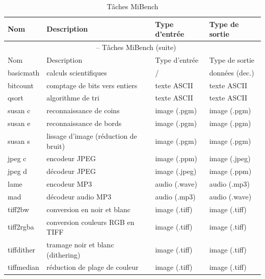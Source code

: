\documentclass[french, a4paper, 11pt, twoside, pdftex]{StyleThese}
\begin{document}
\setlength{\tabcolsep}{4pt}    
\begin{longtable}{@{}llll@{}}
	\caption{Tâches MiBench}\label{tab:mibench_tasks} \\
		\toprule
		Nom          & Description                                  & Type d'entrée      & Type de sortie         \\ \midrule
	\endfirsthead
		\multicolumn{4}{c}{\tablename\ \thetable\ -- Tâches MiBench (suite)}\\[1ex]
		\toprule
		Nom          & Description                                  & Type d'entrée      & Type de sortie         \\ \midrule
	\endhead
		\bottomrule 
	\endfoot
		basicmath	 & calculs scientifiques				& /					 & données (dec.)	\\
		bitcount     & comptage de bits	vers entiers        & texte ASCII        & texte ASCII      \\
		qsort        & algorithme de tri                    & texte ASCII        & texte ASCII      \\
		susan c      & reconnaissance de coins              & image (.pgm)       & image (.pgm)     \\
		susan e      & reconnaissance de bords              & image (.pgm)       & image (.pgm)     \\
		susan s      & lissage d'image (réduction de bruit) & image (.pgm)       & image (.pgm)     \\
		jpeg c       & encodeur JPEG                        & image (.ppm)       & image (.jpeg)    \\
		jpeg d       & décodeur JPEG                        & image (.jpeg)      & image (.ppm)     \\
		lame         & encodeur MP3                         & audio (.wave)      & audio (.mp3)     \\
		mad          & décodeur audio MP3                   & audio (.mp3)       & audio (.wave)    \\
		tiff2bw      & conversion en noir et blanc          & image (.tiff)      & image (.tiff)    \\
		tiff2rgba    & conversion couleurs RGB en TIFF		& image (.tiff)      & image (.tiff)    \\
		tiffdither   & tramage noir et blanc (dithering)    & image (.tiff)      & image (.tiff)    \\
		tiffmedian   & réduction de plage de couleur      	& image (.tiff)      & image (.tiff)    \\

\end{longtable}
\end{document}
